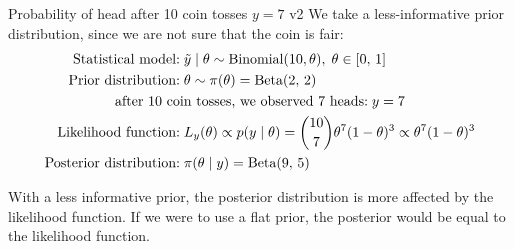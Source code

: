 \begin{example}{Probability of head after 10 coin tosses $y=7$ v2}{}
	We take a less-informative prior distribution, since we are not sure that the coin
	is fair:
	\begin{alignat*}{1}
		\text{Statistical model:}      & \; \tilde y \mid \theta \sim \text{Binomial}(10, \theta), \; \theta \in [0,\,1] \\
		\text{Prior distribution:}     & \; \theta \sim \pi(\theta) = \text{Beta}(2,\,2)                                 \\
		\span \text{after 10 coin tosses, we observed 7 heads:} \; y = 7                                                 \\
		\text{Likelihood function:}    & \; L_y(\theta) \propto p(y \mid \theta) = \binom{10}{7} \theta^7 (1-\theta)^3
		\propto \theta^7 (1-\theta)^3                                                                                    \\
		\text{Posterior distribution:} & \; \pi(\theta \mid y) = \text{Beta}(9,\,5)
	\end{alignat*}
	\vspace{-1em}
	\begin{nscenter}
	\end{nscenter}
	\begin{note}
		With a less informative prior, the posterior distribution is more affected by the
		likelihood function. If we were to use a flat prior, the posterior would be equal
		to the likelihood function.
	\end{note}
\end{example}

